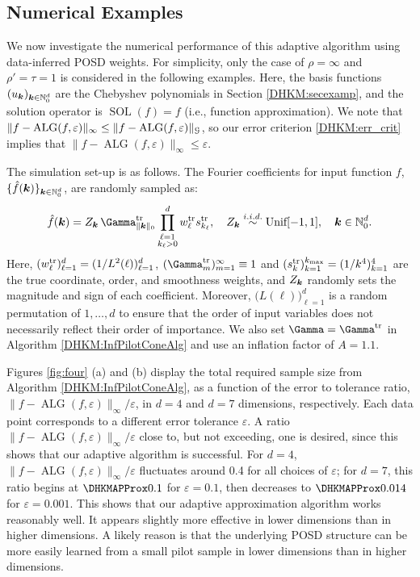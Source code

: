 \documentclass[USenglish]{article}
\theoremstyle{dgthm}
\theoremstyle{dgthm}
\theoremstyle{dgthm}
\theoremstyle{dgthm}
\theoremstyle{dgdef}
\theoremstyle{definition}
\DeclareMathOperator{\DHKMSOL}{SOL}
\DeclareMathOperator{\DHKMALG}{ALG}
\begin{document}
\subsection{Numerical Examples} \label{DHKM:numexamp_sec}

We now investigate the numerical performance of this adaptive algorithm using data-inferred POSD weights. For simplicity, only the case of $\rho = \infty$ and $\rho' = \tau = 1$ is considered in the following examples. Here, the basis functions $(u_{\boldsymbol{k}})_{{\boldsymbol{k}} \in \mathbb{N}_0^d}$ are the Chebyshev polynomials in Section \ref{DHKM:secexamp}, and the solution operator is $\DHKMSOL (f) = f$ (i.e., function approximation). We note that $\|f - \DHKMALG(f,\varepsilon)\|_\infty \le \|f - \DHKMALG(f,\varepsilon)\|_\calG$, so our error criterion \eqref{DHKM:err_crit} implies that $\|f - \DHKMALG(f,\varepsilon)\|_\infty \le \varepsilon$.

The simulation set-up is as follows. The Fourier coefficients for input function $f$, $\{\hat{f}({\boldsymbol{k}})\}_{{\boldsymbol{k}} \in \mathbb{N}_0^d}$, are randomly sampled as:
\begin{equation*}
\hat{f}(\bsk) = Z_{\bsk} \,  {\Gamma}_{\|\bsk\|_0}^{\rm tr} \prod_{\substack{\ell=1\\ k_\ell>0}}^d {w_\ell^{\rm tr}} {s}_{k_\ell}^{\rm tr}, \quad Z_{\bsk} \overset{i.i.d.}{\sim} \text{Unif}[-1, 1], \quad \bsk \in \mathbb{N}_0^d.
\end{equation*}
Here, $(w_\ell^{\rm tr})_{\ell=1}^d = (1/L^2(\ell))_{\ell=1}^d$, $({\Gamma_m^{\rm tr}})_{m=1}^\infty \equiv 1$ and $(s_k^{\rm tr})_{k=1}^{k_{\rm max}} = (1/k^4)_{k=1}^4$ are the true coordinate, order, and smoothness weights, and $Z_{{\boldsymbol{k}}}$ randomly sets the magnitude and sign of each coefficient. Moreover, $\bigl(L(\ell)\bigr)_{\ell=1}^d$ is a random permutation of $1, \ldots, d$ to ensure that the order of input variables does not necessarily reflect their order of importance. We also set $\boldsymbol{\Gamma} = \boldsymbol{\Gamma}^{\rm tr}$ in Algorithm \ref{DHKM:InfPilotConeAlg} and use an inflation factor of $A = 1.1$.

Figures \ref{fig:four} (a) and (b) display the total required sample size from Algorithm \ref{DHKM:InfPilotConeAlg}, as a function of the error to tolerance ratio, $\|f - \DHKMALG(f,\varepsilon)\|_\infty/\varepsilon$, in $d=4$ and $d=7$ dimensions, respectively. Each data point corresponds to a different error tolerance $\varepsilon$. A ratio $\|f - \DHKMALG(f,\varepsilon)\|_\infty/\varepsilon$ close to, but not exceeding, one is desired, since this shows that our adaptive algorithm is successful. For $d=4$, $\|f - \DHKMALG(f,\varepsilon)\|_\infty/\varepsilon$ fluctuates around 0.4 for all choices of $\varepsilon$; for $d=7$, this ratio begins at $\DHKMAPProx 0.1$ for $\varepsilon = 0.1$, then decreases to $\DHKMAPProx 0.014$ for $\varepsilon = 0.001$. This shows that our adaptive approximation algorithm works reasonably well.  It appears slightly more effective in lower dimensions  than in higher dimensions. A likely reason is that the underlying POSD structure can be more easily learned from a small pilot sample in lower dimensions than in higher dimensions.
\end{document}
